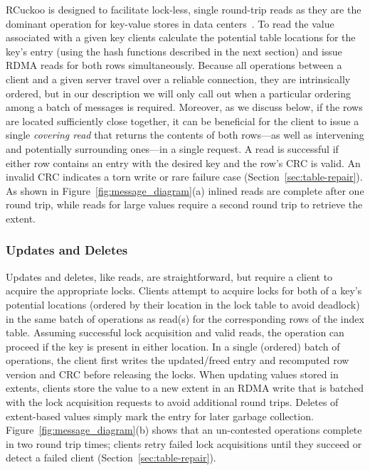 RCuckoo is designed to facilitate lock-less, single round-trip reads as
they are the dominant operation for key-value stores in data
centers~\cite{facebook-memcached}. To read the value associated with a
given key clients calculate the potential table locations for the
key's entry (using the hash functions described in the next section)
and issue RDMA reads for both rows simultaneously.  Because all
operations between a client and a given server travel over a reliable
connection, they are intrinsically ordered, but in our description we
will only call out when a particular ordering among a batch of
messages is required.  Moreover, as we discuss below, if the rows are
located sufficiently close together, it can be beneficial for the
client to issue a single \emph{covering read} that returns the
contents of both rows---as well as intervening and potentially
surrounding ones---in a single request.  A read is successful if
either row contains an entry with the desired key and the row's CRC is
valid. An invalid CRC indicates a torn write or rare
failure case (Section~\ref{sec:table-repair}).  As shown in
Figure~\ref{fig:message_diagram}(a) inlined reads are complete after
one round trip, while reads for large values require a second round
trip to retrieve the extent.


\subsubsection{Updates and Deletes}

Updates and deletes, like reads, are straightforward, but require a
client to acquire the appropriate locks.  Clients attempt to acquire
locks for both of a key's potential locations (ordered by their
location in the lock table to avoid deadlock) in the same batch of
operations as read(s) for the corresponding rows of the index table.
Assuming successful lock acquisition and valid reads, the operation
can proceed if the key is present in either location.  In a single
(ordered) batch of operations, the client first writes the
updated/freed entry and recomputed row version and CRC before
releasing the locks. When updating values stored in extents, clients
store the value to a new extent in an RDMA write that is batched with
the lock acquisition requests to avoid additional round trips.
Deletes of extent-based values simply mark the entry for later garbage
collection.  Figure~\ref{fig:message_diagram}(b) shows that an
un-contested operations complete in two round trip times; clients
retry failed lock acquisitions until they succeed or detect a failed
client (Section~\ref{sec:table-repair}).

